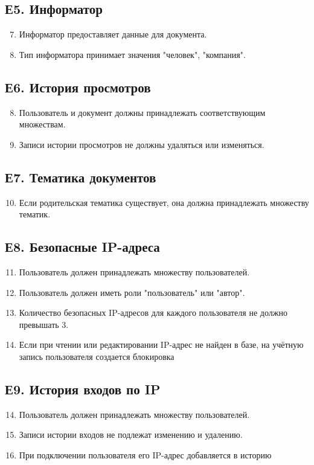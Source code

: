 \subsection*{Е5. Информатор}
\begin{enumerate}
\setcounter{enumi}{6}
\item Информатор предоставляет данные для документа.
\item Тип информатора принимает значения "человек", "компания".
\end{enumerate}

\subsection*{Е6. История просмотров}
\begin{enumerate}
\setcounter{enumi}{7}
\item Пользователь и документ должны принадлежать соответствующим множествам.
\item Записи истории просмотров не должны удаляться или изменяться.
\end{enumerate}

\subsection*{Е7. Тематика документов}
\begin{enumerate}
\setcounter{enumi}{9}
\item Если родительская тематика существует, она должна принадлежать множеству тематик.
\end{enumerate}

\subsection*{Е8. Безопасные IP-адреса}
\begin{enumerate}
\setcounter{enumi}{10}
\item Пользователь должен принадлежать множеству пользователей.
\item Пользователь должен иметь роли "пользователь" или "автор".
\item Количество безопасных IP-адресов для каждого пользователя не должно превышать 3.
\item Если при чтении или редактировании IP-адрес не найден в базе, на учётную запись пользователя создается блокировка
\end{enumerate}

\subsection*{Е9. История входов по IP}
\begin{enumerate}
\setcounter{enumi}{13}
\item Пользователь должен принадлежать множеству пользователей.
\item Записи истории входов не подлежат изменению и удалению.
\item При подключении пользователя его IP-адрес добавляется в историю
\end{enumerate}

